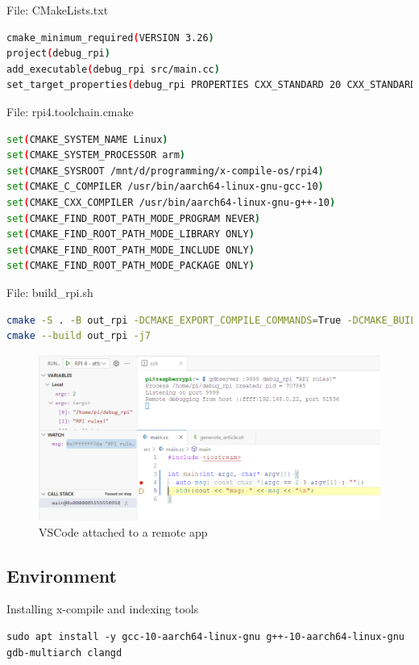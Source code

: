 \documentclass[twocolumn, 10pt]{article}
\begin{document}
\tiny{}File: CMakeLists.txt\small{}
\begin{lstlisting}[language=sh,breaklines=true,caption={}]
cmake_minimum_required(VERSION 3.26)
project(debug_rpi)
add_executable(debug_rpi src/main.cc)
set_target_properties(debug_rpi PROPERTIES CXX_STANDARD 20 CXX_STANDARD_REQUIRED True)
\end{lstlisting}
  
\tiny{}File: rpi4.toolchain.cmake\small{}
\begin{lstlisting}[language=sh,breaklines=true,caption={}]
set(CMAKE_SYSTEM_NAME Linux)
set(CMAKE_SYSTEM_PROCESSOR arm)
set(CMAKE_SYSROOT /mnt/d/programming/x-compile-os/rpi4)
set(CMAKE_C_COMPILER /usr/bin/aarch64-linux-gnu-gcc-10)
set(CMAKE_CXX_COMPILER /usr/bin/aarch64-linux-gnu-g++-10)
set(CMAKE_FIND_ROOT_PATH_MODE_PROGRAM NEVER)
set(CMAKE_FIND_ROOT_PATH_MODE_LIBRARY ONLY)
set(CMAKE_FIND_ROOT_PATH_MODE_INCLUDE ONLY)
set(CMAKE_FIND_ROOT_PATH_MODE_PACKAGE ONLY)
\end{lstlisting}
  
\tiny{}File: build\_rpi.sh\small{}
\begin{lstlisting}[language=sh,breaklines=true,caption={}]
cmake -S . -B out_rpi -DCMAKE_EXPORT_COMPILE_COMMANDS=True -DCMAKE_BUILD_TYPE=Debug --toolchain rpi4.toolchain.cmake
cmake --build out_rpi -j7
\end{lstlisting}

\begin{figure}
  \includegraphics[width=\linewidth]{res/remote_debug_rpi_light.png}
  \caption*{VSCode attached to a remote app}
  \label{fig:debug}
\end{figure}

\subsection*{Environment}
Installing x-compile and indexing tools 
\begin{lstlisting}[backgroundcolor=\color{gray!10},caption={}]
sudo apt install -y gcc-10-aarch64-linux-gnu g++-10-aarch64-linux-gnu gdb-multiarch clangd
\end{lstlisting}
\end{document}
